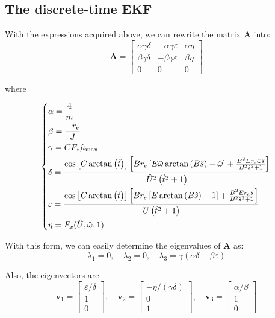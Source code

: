 \documentclass[letterpaper,12pt]{article}
\begin{document}
\subsection*{The discrete-time EKF}
With the expressions acquired above, we can rewrite the matrix $\mathbf{A}$ into:
\begin{equation*}
\mathbf{A} = 
\left[
\begin{array}{ccc}
\alpha \gamma \delta & -\alpha \gamma \varepsilon & \alpha \eta \\
\beta \gamma \delta & -\beta \gamma \varepsilon & \beta \eta \\
0 & 0 & 0
\end{array}
\right]
\end{equation*}
\begin{center}
where
\end{center}
\begin{equation*}
\begin{dcases}
\alpha =  \frac{4}{m}\\
\beta = \frac{-r_e}{J}\\
\gamma = C F_z \hat{\mu}_{\max}\\
\delta = \frac{\cos\left[C\arctan\left(\hat{t}\right)\right]\left[B r_e  \left[E\hat{\omega} \arctan\left(B\hat{s}\right)- \hat{\omega}\right]+\frac{B^2 E r_e\hat{\omega} \hat{s}}{B^2 {\hat{s}}^2+1}\right]}{\hat{U}^2\left(\hat{t}^2+1\right)}\\
\varepsilon = \frac{\cos\left[C\arctan\left(\hat{t}\right)\right]\left[B r_e \left[ E \arctan\left(B \hat{s} \right)-1 \right]+\frac{B^2 E r_e \hat{s}}{B^2{\hat{s}}^2+1}\right]}{U\left(\hat{t}^2+1\right)}\\
\eta = F_x (\hat{U},\hat{\omega},1) 
\end{dcases}
\end{equation*}
\par
With this form, we can easily determine the eigenvalues of $\mathbf{A}$ as:
\begin{equation*}
\lambda_1 = 0,\quad \lambda_2 = 0, \quad \lambda_3 = \gamma\left(\alpha \delta - \beta \varepsilon\right)
\end{equation*}
\par
Also, the eigenvectors are:
\begin{equation*}
\mathbf{v}_1 = 
\left[
\begin{array}{c}
\varepsilon/\delta \\
1 \\
0
\end{array}
\right]
, \quad \mathbf{v}_2 = 
\left[
\begin{array}{c}
-\eta/(\gamma\delta) \\
0 \\
1
\end{array}
\right]
, \quad \mathbf{v}_3 = 
\left[
\begin{array}{c}
\alpha/\beta \\
1 \\
0
\end{array}
\right]
\end{equation*}
\end{document}
